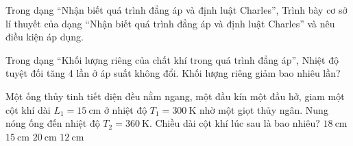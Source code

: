 \begin{ex}
Trong dạng “Nhận biết quá trình đẳng áp và định luật Charles”, Trình bày cơ sở lí thuyết của dạng “Nhận biết quá trình đẳng áp và định luật Charles” và nêu điều kiện áp dụng.
\choiceTF

\end{ex}

\begin{ex}
Trong dạng “Khối lượng riêng của chất khí trong quá trình đẳng áp”, Nhiệt độ tuyệt đối tăng 4 lần ở áp suất không đổi. Khối lượng riêng giảm bao nhiêu lần?
\end{ex}

\begin{ex}
Một ống thủy tinh tiết diện đều nằm ngang, một đầu kín một đầu hở, giam một cột khí dài $L_1 = 15\ \mathrm{cm}$ ở nhiệt độ $T_1 = 300\ \mathrm{K}$ nhờ một giọt thủy ngân. Nung nóng ống đến nhiệt độ $T_2 = 360\ \mathrm{K}$. Chiều dài cột khí lúc sau là bao nhiêu?
\choice
{\True $18\ \mathrm{cm}$}
{$15\ \mathrm{cm}$}
{$20\ \mathrm{cm}$}
{$12\ \mathrm{cm}$}
\end{ex}

